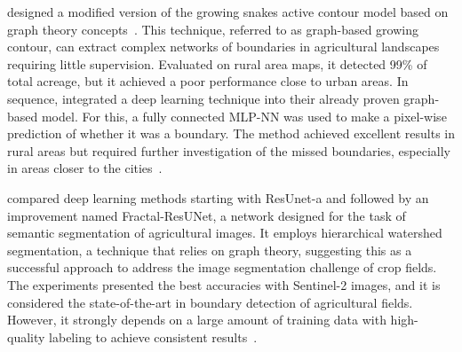 \documentclass[12pt]{article}
\begin{document}
\citet{wagner2020} designed a modified version of the growing snakes active contour model based on graph theory concepts~\cite{wagner2020}. This technique, referred to as graph-based growing contour, can extract complex networks of boundaries in agricultural landscapes requiring little supervision. Evaluated on rural area maps, it detected 99\% of total acreage, but it achieved a poor performance close to urban areas. In sequence, \citet{wagner2020.2} integrated a deep learning technique into their already proven graph-based model. For this, a fully connected MLP-NN was used to make a pixel-wise prediction of whether it was a boundary. The method achieved excellent results in rural areas but required further investigation of the missed boundaries, especially in areas closer to the cities~\cite{wagner2020.2,wagner2020}.


\citet{waldner2020} compared deep learning methods starting with ResUnet-a and followed by an improvement named Fractal-ResUNet, a network designed for the task of semantic segmentation of agricultural images. It employs hierarchical watershed segmentation, a technique that relies on graph theory, suggesting this as a successful approach to address the image segmentation challenge of crop fields. The experiments presented the best accuracies with Sentinel-2 images, and it is considered the state-of-the-art in boundary detection of agricultural fields. However, it strongly depends on a large amount of training data with high-quality labeling to achieve consistent results~\cite{waldner2020,waldner2021}.

\end{document}

